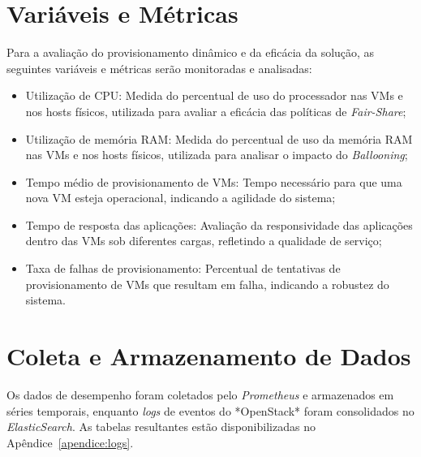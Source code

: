 \section{Variáveis e Métricas}
Para a avaliação do provisionamento dinâmico e da eficácia da solução, as seguintes variáveis e métricas serão monitoradas e analisadas:
\begin{itemize}
\item Utilização de CPU: Medida do percentual de uso do processador nas VMs e nos hosts físicos, utilizada para avaliar a eficácia das políticas de \textit{Fair-Share};
\item Utilização de memória RAM: Medida do percentual de uso da memória RAM nas VMs e nos hosts físicos, utilizada para analisar o impacto do \textit{Ballooning};
\item Tempo médio de provisionamento de VMs: Tempo necessário para que uma nova VM esteja operacional, indicando a agilidade do sistema;
\item Tempo de resposta das aplicações: Avaliação da responsividade das aplicações dentro das VMs sob diferentes cargas, refletindo a qualidade de serviço;
\item Taxa de falhas de provisionamento: Percentual de tentativas de provisionamento de VMs que resultam em falha, indicando a robustez do sistema.
\end{itemize}

\section{Coleta e Armazenamento de Dados}
Os dados de desempenho foram coletados pelo \textit{Prometheus} e armazenados em séries temporais, enquanto \textit{logs} de eventos do *OpenStack* foram consolidados no \textit{ElasticSearch}. As tabelas resultantes estão disponibilizadas no Apêndice~\ref{apendice:logs}.